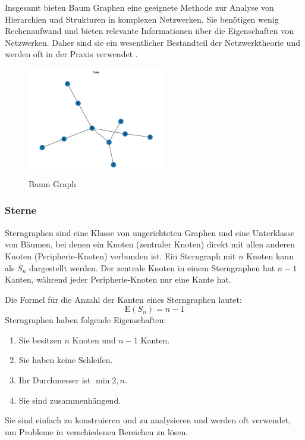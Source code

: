 Insgesamt bieten Baum Graphen eine geeignete Methode zur Analyse von Hierarchien und Strukturen in komplexen Netzwerken.
Sie benötigen wenig Rechenaufwand und bieten relevante Informationen über die Eigenschaften von Netzwerken.
Daher sind sie ein wesentlicher Bestandteil der Netzwerktheorie und werden oft in der Praxis verwendet \cite{cayley_analytical_1881,emmert-streib_mathematical_2020}.

\begin{figure}[H]
    \centering
    \includegraphics[width=6cm]{images/20_material_methods/tree.png}
    \caption{Baum Graph}
    \label{fig:tree-graph}
\end{figure}

\subsubsection{Sterne}

Sterngraphen sind eine Klasse von ungerichteten Graphen und eine Unterklasse von Bäumen, bei denen ein Knoten (zentraler Knoten) direkt mit allen anderen Knoten (Peripherie-Knoten) verbunden ist. 
Ein Sterngraph mit $n$ Knoten kann als $S_n$ dargestellt werden. 
Der zentrale Knoten in einem Sterngraphen hat $n-1$ Kanten, während jeder Peripherie-Knoten nur eine Kante hat.

Die Formel für die Anzahl der Kanten eines Sterngraphen lautet:
\begin{equation}
    \text{E}(S_n) = n-1
\end{equation}
Sterngraphen haben folgende Eigenschaften:
\begin{enumerate}
    \item Sie besitzen $n$ Knoten und $n-1$ Kanten.
    \item Sie haben keine Schleifen.
    \item Ihr Durchmesser ist $\min{2, n}$.
    \item Sie sind zusammenhängend.
\end{enumerate}

Sie sind einfach zu konstruieren und zu analysieren und werden oft verwendet, um Probleme in verschiedenen Bereichen zu lösen.

